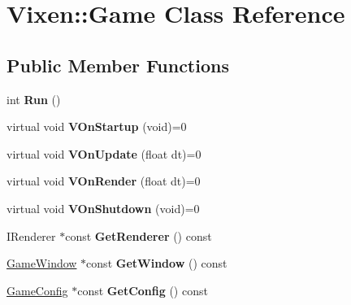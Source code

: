 \hypertarget{class_vixen_1_1_game}{}\section{Vixen\+:\+:Game Class Reference}
\label{class_vixen_1_1_game}
\subsection*{Public Member Functions}
\begin{DoxyCompactItemize}
\item 
\hypertarget{class_vixen_1_1_game_aa2079284187ee31746b529a3f85efa5a}{}int {\bfseries Run} ()\label{class_vixen_1_1_game_aa2079284187ee31746b529a3f85efa5a}

\item 
\hypertarget{class_vixen_1_1_game_a92f34dd46ae2ce8cee0bb5c618372e9d}{}virtual void {\bfseries V\+On\+Startup} (void)=0\label{class_vixen_1_1_game_a92f34dd46ae2ce8cee0bb5c618372e9d}

\item 
\hypertarget{class_vixen_1_1_game_a3d36cc170600c181c3d6cef0d2eb87e8}{}virtual void {\bfseries V\+On\+Update} (float dt)=0\label{class_vixen_1_1_game_a3d36cc170600c181c3d6cef0d2eb87e8}

\item 
\hypertarget{class_vixen_1_1_game_a0c405038f67206aaf1ac5358912c4aa2}{}virtual void {\bfseries V\+On\+Render} (float dt)=0\label{class_vixen_1_1_game_a0c405038f67206aaf1ac5358912c4aa2}

\item 
\hypertarget{class_vixen_1_1_game_af56394bc5d03009f05c1689ec80f7cbf}{}virtual void {\bfseries V\+On\+Shutdown} (void)=0\label{class_vixen_1_1_game_af56394bc5d03009f05c1689ec80f7cbf}

\item 
\hypertarget{class_vixen_1_1_game_a3ee45729c63e670e49956dce406406d6}{}I\+Renderer $\ast$const {\bfseries Get\+Renderer} () const \label{class_vixen_1_1_game_a3ee45729c63e670e49956dce406406d6}

\item 
\hypertarget{class_vixen_1_1_game_a58718d4efafc76fab2e4687c2648caff}{}\hyperlink{class_vixen_1_1_game_window}{Game\+Window} $\ast$const {\bfseries Get\+Window} () const \label{class_vixen_1_1_game_a58718d4efafc76fab2e4687c2648caff}

\item 
\hypertarget{class_vixen_1_1_game_a6816f8e6057cbc2fa56b1163073891c0}{}\hyperlink{class_vixen_1_1_game_config}{Game\+Config} $\ast$const {\bfseries Get\+Config} () const \label{class_vixen_1_1_game_a6816f8e6057cbc2fa56b1163073891c0}

\end{DoxyCompactItemize}
